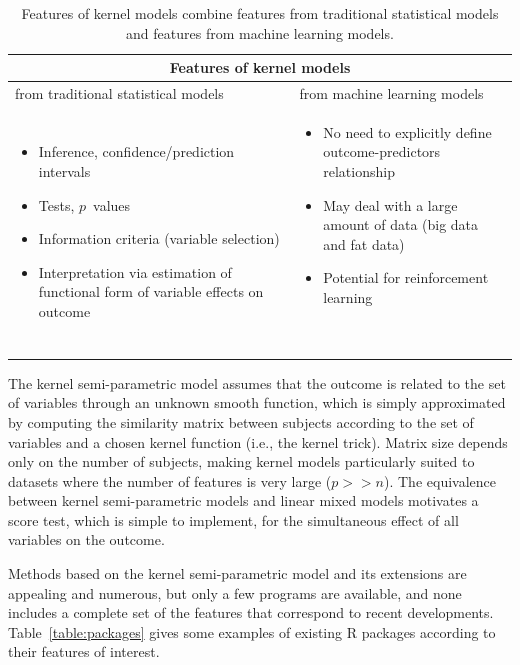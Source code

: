 \begin{table}[htbp]
\begin{center}
\begin{tabular}{p{7cm}p{6cm}}
\toprule
\multicolumn{2}{c}{Features of kernel models} \\
\midrule
from traditional statistical models & from machine learning models \\
\midrule
\begin{itemize}
  \item Inference, confidence/prediction intervals
    \item Tests, $p$~values
    \item Information criteria (variable selection)
    \item Interpretation via estimation of functional form of variable effects on outcome
\end{itemize}
&
\begin{itemize}
    \item No need to explicitly define outcome-predictors relationship
    \item May deal with a large amount of data (big data and fat data)
    \item Potential for reinforcement learning
\end{itemize}
~\\
\bottomrule
\end{tabular}
\caption{\label{table:MLvsStat} Features of kernel models combine features from traditional statistical models and features from machine learning models.}
\end{center}
\end{table}



The kernel semi-parametric model assumes that the outcome is related to the set of variables through an unknown smooth function, which is simply approximated by computing the similarity matrix between subjects according to the set of variables and a chosen kernel function (i.e., the kernel trick). Matrix size depends only on the number of subjects, making kernel models particularly suited to datasets where the number of features is very large ($p >>n$). The equivalence between kernel semi-parametric models and linear mixed models motivates a score test, which is simple to implement, for the simultaneous effect of all variables on the outcome.




Methods based on the kernel semi-parametric model and its extensions are appealing and numerous, but only a few programs are available, and none includes a complete set of the features that correspond to recent developments. Table~\ref{table:packages} gives some examples of existing R packages according to their features of interest. 


